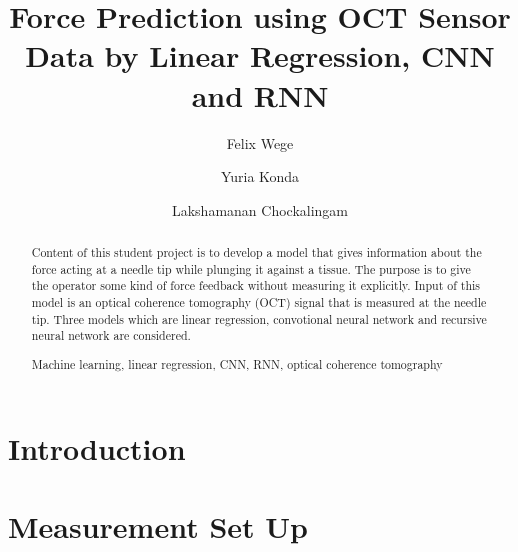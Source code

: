 \documentclass[runningheads,a4paper]{llncs}
\newcommand{\keywords}[1]{\par\addvspace\baselineskip
\noindent\keywordname\enspace\ignorespaces#1}
\begin{document}
\mainmatter  %

\title{Force Prediction using OCT Sensor Data 
by Linear Regression, CNN and RNN}

\author{Felix Wege \and Yuria Konda \and Lakshamanan Chockalingam}



\maketitle


\begin{abstract}
Content of this student project is to develop a model that gives 
information about the force acting at a needle tip while plunging it against 
a tissue.
The purpose is to give the operator some kind of force feedback
without measuring it explicitly.
Input of this model is an optical coherence tomography (OCT) signal
that is measured at the needle tip.
Three models which are linear regression, convotional neural network
and recursive neural network are considered.

\keywords{Machine learning, linear regression, CNN, RNN, optical coherence tomography}
\end{abstract}

\section{Introduction}\label{sec:intro}


\section{Measurement Set Up}\label{sec:msu}

\end{document}

